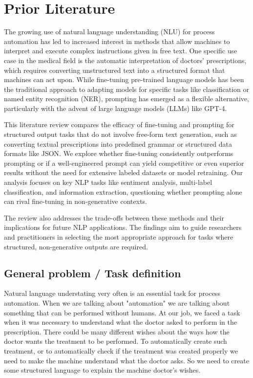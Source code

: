 \documentclass[11pt]{article}
\begin{document}
\section{Prior Literature}

The growing use of natural language understanding (NLU) for process automation has led to increased interest in methods that allow machines to interpret and execute complex instructions given in free text. One specific use case in the medical field is the automatic interpretation of doctors' prescriptions, which requires converting unstructured text into a structured format that machines can act upon. While fine-tuning pre-trained language models has been the traditional approach to adapting models for specific tasks like classification or named entity recognition (NER), prompting has emerged as a flexible alternative, particularly with the advent of large language models (LLMs) like GPT-4.

This literature review compares the efficacy of fine-tuning and prompting for structured output tasks that do not involve free-form text generation, such as converting textual prescriptions into predefined grammar or structured data formats like JSON. We explore whether fine-tuning consistently outperforms prompting or if a well-engineered prompt can yield competitive or even superior results without the need for extensive labeled datasets or model retraining. Our analysis focuses on key NLP tasks like sentiment analysis, multi-label classification, and information extraction, questioning whether prompting alone can rival fine-tuning in non-generative contexts.

The review also addresses the trade-offs between these methods and their implications for future NLP applications. The findings aim to guide researchers and practitioners in selecting the most appropriate approach for tasks where structured, non-generative outputs are required.

\subsection{General problem / Task definition}
  
Natural language understating very often is an essential task for process automation. When we are talking about "automation" we are talking about something that can be performed without humans. At our job, we faced a task when it was necessary to understand what the doctor asked to perform in the prescription. There could be many different wishes about the ways how the doctor wants the treatment to be performed. To automatically create such treatment, or to automatically check if the treatment was created properly we need to make the machine understand what the doctor asks. So we need to create some structured language to explain the machine doctor's wishes. 
\end{document}
